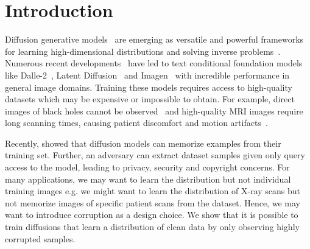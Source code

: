 \documentclass{article}
\begin{document}
\section{Introduction}

Diffusion generative models~\cite{sohl_thermodynamics, ddpm, ncsn} are emerging as versatile and powerful frameworks for learning high-dimensional distributions and solving inverse problems~\citep{ddrm, dps, kawar2021snips, mri_paper}. Numerous recent developments~\cite{ncsnv3,karras2022elucidating} have led to text conditional foundation models like Dalle-2~\cite{nichol_dalle_2022}, Latent Diffusion~\cite{rombach2022high} and Imagen~\cite{imagen} with incredible performance in general image domains. Training these models requires access to high-quality datasets which may be expensive or impossible to obtain. For example, direct images of black holes cannot be observed~\citep{Akiyama_2019, gao2023image}
and high-quality MRI images require long scanning times, causing patient discomfort and motion artifacts~\citep{mri_paper}. 


Recently, \citet{carlini_extracting_2021, somepalli2022diffusion, jagielski_measuring_2022} showed that diffusion models can memorize examples from their training set. Further, an adversary can extract dataset samples given only query access to the model, leading to privacy, security and copyright concerns. 
For many applications, we may want to learn the distribution but not individual training images e.g. we might want to learn the distribution of X-ray scans but not memorize images of specific patient scans from the dataset. Hence, we may want to introduce corruption as a design choice. We show that it is possible to train diffusions that learn a distribution of clean data by only observing highly corrupted samples. 
\end{document}
